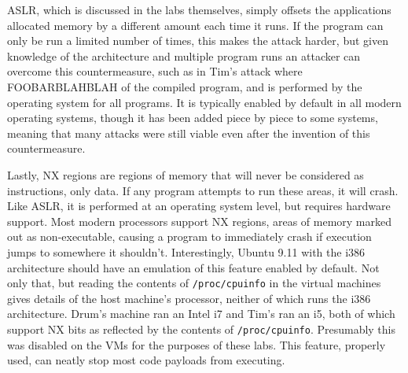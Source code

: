 ASLR, which is discussed in the labs themselves, simply offsets the applications allocated memory by a different amount
each time it runs. If the program can only be run a limited number of times, this makes the attack harder, but given
knowledge of the architecture and multiple program runs an attacker can overcome this countermeasure, such as in Tim's
attack where FOOBARBLAHBLAH %
of the compiled program, and is performed by the operating system for all programs. It is typically enabled by default
in all modern operating systems, though it has been added piece by piece to some systems, meaning that many attacks were
still viable even after the invention of this countermeasure.\cite{wiki_aslr}

Lastly, NX regions\cite{wiki_nx} are regions of memory that will never be considered as instructions, only data. If any
program attempts to run these areas, it will crash. Like ASLR, it is performed at an operating system level, but
requires hardware support.  Most modern processors support NX regions, areas of memory marked out as non-executable,
causing a program to immediately crash if execution jumps to somewhere it shouldn't. Interestingly, Ubuntu 9.11 with the
i386 architecture should have an emulation of this feature enabled by default\cite{nx_bit}. Not only that, but reading
the contents of {\tt /proc/cpuinfo} in the virtual machines gives details of the host machine's processor, neither of
which runs the i386 architecture. Drum's machine ran an Intel i7 and Tim's ran an i5, both of which support NX bits as
reflected by the contents of {\tt /proc/cpuinfo}. Presumably this was disabled on the VMs for the purposes of these
labs. This feature, properly used, can neatly stop most code payloads from executing.


